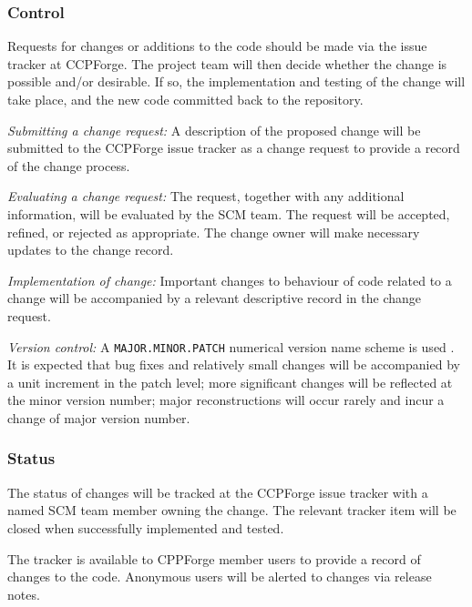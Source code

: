 \documentclass[11pt,twoside]{article}
\begin{document}
\subsubsection{Control}

Requests for changes or additions to the code should be made via
the issue tracker at CCPForge. The project team will then decide
whether the change is possible and/or desirable. If so, the
implementation and testing of the change will take place, and the
new code committed back to the repository.

\textit{Submitting a change request:} A description of the proposed change
will be submitted to the CCPForge issue tracker as a change request to
provide a record of the change process.

\textit{Evaluating a change request:} The request, together with any
additional information, will be evaluated by the SCM team. The request
will be accepted, refined, or rejected as appropriate. The change owner
will make necessary updates to the change record.

\textit{Implementation of change:} Important changes to behaviour of code
related to a change will be
accompanied by a relevant descriptive record in the change request.

\textit{Version control:} A \texttt{MAJOR.MINOR.PATCH} numerical version
name scheme is used \cite{apacheAPR}.
It is expected that bug fixes and relatively
small changes will be accompanied by a unit increment in the patch level;
more significant changes will be reflected at the minor version number;
major reconstructions will occur rarely and incur a change of major version
number.

\subsubsection{Status}


The status of changes will be tracked at the CCPForge issue tracker
with a named SCM team member owning the change. The relevant tracker
item will be closed when successfully implemented and tested.

The tracker is available to CPPForge member users to provide a record
of changes to the code. Anonymous users will be alerted to changes via
release notes.

\end{document}
